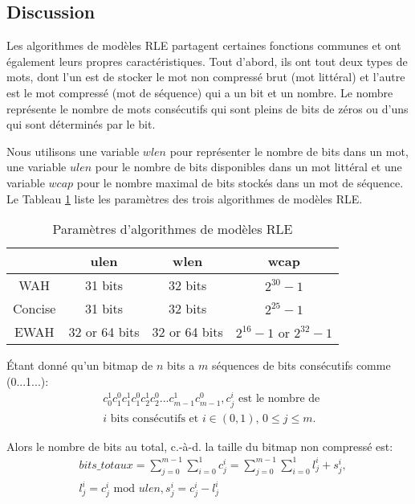\subsection{Discussion}

Les algorithmes de modèles RLE partagent certaines fonctions communes et ont également leurs propres caractéristiques. Tout d'abord, ils ont tout deux types de mots, dont l'un est de stocker le mot non compressé brut (mot littéral) et l'autre est le mot compressé (mot de séquence) qui a un bit et un nombre. Le nombre représente le nombre de mots consécutifs qui sont pleins de bits de zéros ou d'uns qui sont déterminés par le bit.

Nous utilisons une variable $wlen$ pour représenter le nombre de bits dans un mot, une variable $ulen$ pour le nombre de bits disponibles dans un mot littéral et une variable $wcap$ pour le nombre maximal de bits stockés dans un mot de séquence. Le Tableau \ref{tbl:bm:bmparms} liste les paramètres des trois algorithmes de modèles RLE.

\begin{table}[h]
\centering
\begin{tabular}{|c|c|c|c|}
\hline
& ulen & wlen & wcap \\
\hline
WAH & 31 bits & 32 bits & $2^{30} - 1$ \\
\hline
Concise & 31 bits & 32 bits & $2^{25} - 1$ \\
\hline
EWAH & 32 or 64 bits & 32 or 64 bits & $2^{16} - 1 \text{ or } 2^{32} - 1$ \\
\hline
\end{tabular}
\caption{Paramètres d'algorithmes de modèles RLE}
\label{tbl:bm:bmparms}
\end{table}

Étant donné qu'un bitmap de $n$ bits a $m$ séquences de bits consécutifs comme (0...1...):
\begin{align*}
& c^1_0c^0_1c^1_1c^0_1c^1_2c^0_2...c^1_{m - 1}c^0_{m - 1}, c^i_j \text{ est le nombre de } \\
& i \text{ bits consécutifs et } i \in (0, 1),\, 0 \leq j \leq m.  
\end{align*}

Alors le nombre de bits au total, c.-à-d. la taille du bitmap non compressé est:
\begin{align*}
& \textit{bits\_totaux} = \sum_{j = 0}^{m - 1} \sum_{i = 0}^1 c^i_j = \sum_{j = 0}^{m - 1} \sum_{i = 0}^1 l^i_j + s^i_j, \\
& l^i_j = c^i_j \text{ mod } ulen, s^i_j = c^i_j - l^i_j
\end{align*}


